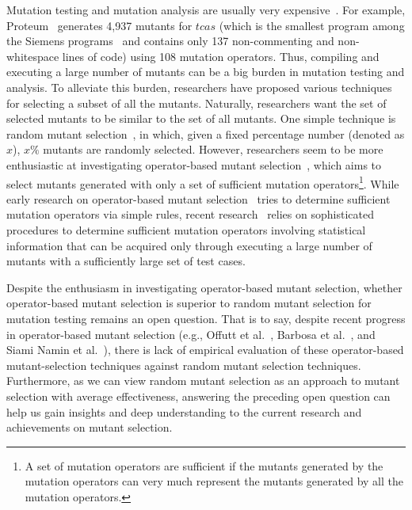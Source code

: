 Mutation testing and mutation analysis are usually very
expensive~\cite{Budd:80b,Mathur:91,Wong:93,Offutt:96,SiamiNamin:08}.
For example, Proteum~\cite{Delamaro:96} generates 4,937 mutants for
$tcas$ (which is the smallest program among the Siemens
programs~\cite{Hutchins:94} and contains only 137 non-commenting and
non-whitespace lines of code) using 108 mutation operators. Thus,
compiling and executing a large number of mutants can be a big
burden in mutation testing and analysis. To alleviate this burden,
researchers have proposed various
techniques~\cite{Acree:79,Mathur:91,Wong:93,Wong:95,Offutt:96,Barbosa:01,SiamiNamin:08}
for selecting a subset of all the mutants. Naturally, researchers
want the set of selected mutants to be similar to the set of all
mutants. One simple technique is random mutant
selection~\cite{Acree:79,Wong:93,Wong:95}, in which, given a fixed
percentage number (denoted as $x$), $x\%$ mutants are randomly
selected. However, researchers seem to be more enthusiastic at
investigating operator-based mutant
selection~\cite{Mathur:91,Wong:93,Wong:95,Offutt:96,Barbosa:01,SiamiNamin:08},
which aims to select mutants generated with only a set of sufficient
mutation operators\footnote{A set of mutation operators are
sufficient if the mutants generated by the mutation operators can
very much represent the mutants generated by all the mutation
operators.}. While early research on operator-based mutant
selection~\cite{Wong:93,Wong:95,Offutt:96} tries to determine
sufficient mutation operators via simple rules, recent
research~\cite{Barbosa:01,SiamiNamin:08} relies on sophisticated
procedures to determine sufficient mutation operators involving
statistical information that can be acquired only through executing
a large number of mutants with a sufficiently large set of test
cases.

Despite the enthusiasm in investigating operator-based mutant
selection, whether operator-based mutant selection is superior to
random mutant selection for mutation testing remains an open
question. That is to say, despite recent progress in operator-based
mutant selection (e.g., Offutt et al.~\cite{Offutt:96}, Barbosa et
al.~\cite{Barbosa:01}, and Siami Namin et al.~\cite{SiamiNamin:08}),
there is lack of empirical evaluation of these operator-based
mutant-selection techniques against random mutant selection
techniques. Furthermore, as we can view random mutant selection as
an approach to mutant selection with average effectiveness,
answering the preceding open question can help us gain insights and
deep understanding to the current research and achievements on
mutant selection.


